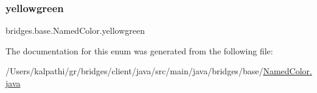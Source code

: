 \subsubsection{\texorpdfstring{yellowgreen}{yellowgreen}}
{\footnotesize\ttfamily bridges.\+base.\+Named\+Color.\+yellowgreen}



The documentation for this enum was generated from the following file\+:\begin{DoxyCompactItemize}
\item 
/\+Users/kalpathi/gr/bridges/client/java/src/main/java/bridges/base/\mbox{\hyperlink{_named_color_8java}{Named\+Color.\+java}}\end{DoxyCompactItemize}
